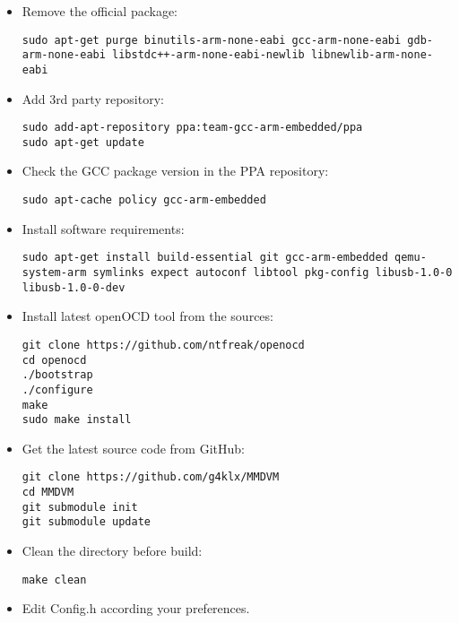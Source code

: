 \documentclass[]{article}
\begin{document}
\begin{itemize}[leftmargin=*]
	
\item Remove the official package:
\begin{lstlisting}[style=DOS]
sudo apt-get purge binutils-arm-none-eabi gcc-arm-none-eabi gdb-arm-none-eabi libstdc++-arm-none-eabi-newlib libnewlib-arm-none-eabi
\end{lstlisting}

\item Add 3rd party repository:
\begin{lstlisting}[style=DOS]
sudo add-apt-repository ppa:team-gcc-arm-embedded/ppa
sudo apt-get update
\end{lstlisting}

\item Check the GCC package version in the PPA repository:
\begin{lstlisting}[style=DOS]
sudo apt-cache policy gcc-arm-embedded
\end{lstlisting}

\item Install software requirements:
\begin{lstlisting}[style=DOS]
sudo apt-get install build-essential git gcc-arm-embedded qemu-system-arm symlinks expect autoconf libtool pkg-config libusb-1.0-0 libusb-1.0-0-dev
\end{lstlisting}

\item Install latest openOCD tool from the sources:
\begin{lstlisting}[style=DOS]
git clone https://github.com/ntfreak/openocd
cd openocd
./bootstrap
./configure
make
sudo make install
\end{lstlisting}
	
\item Get the latest source code from GitHub:
\begin{lstlisting}[style=DOS]
git clone https://github.com/g4klx/MMDVM
cd MMDVM
git submodule init
git submodule update
\end{lstlisting}
	
\item Clean the directory before build:
\begin{lstlisting}[style=DOS]
make clean
\end{lstlisting}
	
\item Edit Config.h according your preferences.
	

\end{itemize}
\end{document}
